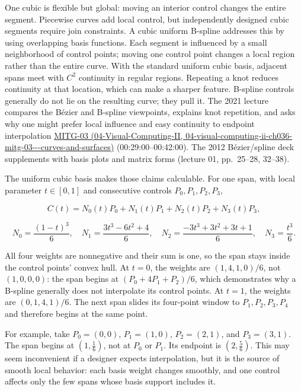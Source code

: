 One cubic is flexible but global: moving an interior control changes the entire segment. Piecewise curves add local control, but independently designed cubic segments require join constraints. A cubic uniform B-spline addresses this by using overlapping basis functions. Each segment is influenced by a small neighborhood of control points; moving one control point changes a local region rather than the entire curve. With the standard uniform cubic basis, adjacent spans meet with \(C^2\) continuity in regular regions. Repeating a knot reduces continuity at that location, which can make a sharper feature. B-spline controls generally do not lie on the resulting curve; they pull it. The 2021 lecture compares the Bézier and B-spline viewpoints, explains knot repetition, and asks why one might prefer local influence and easy continuity to endpoint interpolation \href{../04-Visual-Computing-II/main.pdf\#nameddest=04-visual-computing-ii-ch036-mitg-03---curves-and-surfaces}{MITG-03 (04-Visual-Computing-II, 04-visual-computing-ii-ch036-mitg-03-\/-\/-curves-and-surfaces)} (00:29:00--00:42:00). The 2012 Bézier/spline deck supplements with basis plots and matrix forms (lecture 01, pp.~25--28, 32--38).

The uniform cubic basis makes those claims calculable. For one span, with local parameter \(t\in[0,1]\) and consecutive controls \(P_0,P_1,P_2,P_3\),

\[
C(t)=N_0(t)P_0+N_1(t)P_1+N_2(t)P_2+N_3(t)P_3,
\]

\[
N_0=\frac{(1-t)^3}{6},\quad N_1=\frac{3t^3-6t^2+4}{6},\quad
N_2=\frac{-3t^3+3t^2+3t+1}{6},\quad N_3=\frac{t^3}{6}.
\]

All four weights are nonnegative and their sum is one, so the span stays inside the control points' convex hull. At \(t=0\), the weights are \((1,4,1,0)/6\), not \((1,0,0,0)\): the span begins at \((P_0+4P_1+P_2)/6\), which demonstrates why a B-spline generally does not interpolate its control points. At \(t=1\), the weights are \((0,1,4,1)/6\). The next span slides its four-point window to \(P_1,P_2,P_3,P_4\) and therefore begins at the same point.

For example, take \(P_0=(0,0)\), \(P_1=(1,0)\), \(P_2=(2,1)\), and \(P_3=(3,1)\). The span begins at \((1,\frac16)\), not at \(P_0\) or \(P_1\). Its endpoint is \((2,\frac56)\). This may seem inconvenient if a designer expects interpolation, but it is the source of smooth local behavior: each basis weight changes smoothly, and one control affects only the few spans whose basis support includes it.

